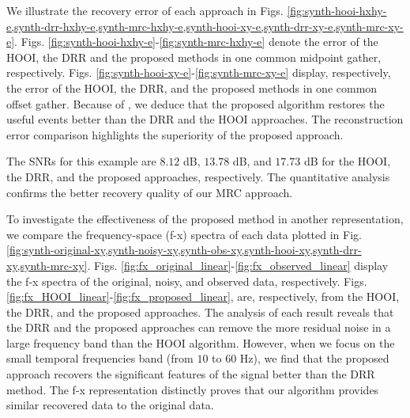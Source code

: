 
We illustrate the recovery error of each approach in Figs. \ref{fig:synth-hooi-hxhy-e,synth-drr-hxhy-e,synth-mrc-hxhy-e,synth-hooi-xy-e,synth-drr-xy-e,synth-mrc-xy-e}. Figs. \ref{fig:synth-hooi-hxhy-e}-\ref{fig:synth-mrc-hxhy-e} denote the error of the HOOI, the DRR and the proposed  methods in one common midpoint gather, respectively. Figs. \ref{fig:synth-hooi-xy-e}-\ref{fig:synth-mrc-xy-e} display, respectively, the error of the HOOI, the DRR, and the proposed  methods in one common offset gather. Because of , we deduce that the proposed  algorithm restores the useful events better than the DRR and the HOOI approaches. The reconstruction error comparison highlights the superiority of the proposed  approach.


The SNRs for this example are $8.12$ dB, $13.78$ dB, and $17.73$ dB for the HOOI, the DRR, and the proposed approaches, respectively. The quantitative analysis confirms the better recovery quality of our MRC approach.

To investigate the effectiveness of the proposed  method in another representation, we compare the frequency-space (f-x) spectra of each data plotted in Fig. \ref{fig:synth-original-xy,synth-noisy-xy,synth-obs-xy,synth-hooi-xy,synth-drr-xy,synth-mrc-xy}. Figs. \ref{fig:fx_original_linear}-\ref{fig:fx_observed_linear} display the f-x spectra of the original, noisy, and observed data, respectively. Figs. \ref{fig:fx_HOOI_linear}-\ref{fig:fx_proposed_linear}, are, respectively, from the HOOI, the DRR, and the proposed approaches. The analysis of each result reveals that the DRR and the proposed  approaches can remove the more residual noise in a large frequency band than the HOOI algorithm. However, when we focus on the small temporal frequencies band (from $10$ to $60$ Hz), we find that the proposed  approach recovers the significant features of the signal better than the DRR method. The f-x representation distinctly proves that our algorithm provides similar recovered data to the original data. 

